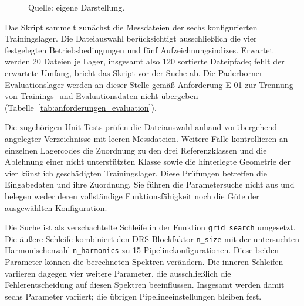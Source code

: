 \begin{figure}[htbp]
{%
  }
  \caption{Trennung von Pipelineverarbeitung und wiederholter
    Detektorauswertung in der Parametersuche}
  \label{fig:parametersuche_ablauf}
  \caption*{\footnotesize Quelle: eigene Darstellung.}
\end{figure}

Das Skript  sammelt zunächst die Messdateien
der sechs konfigurierten Trainingslager. Die Dateiauswahl berücksichtigt
ausschließlich die vier festgelegten Betriebsbedingungen und fünf
Aufzeichnungsindizes. Erwartet werden 20 Dateien je Lager, insgesamt also
120 sortierte Dateipfade; fehlt der erwartete Umfang, bricht das Skript vor
der Suche ab. Die Paderborner Evaluationslager werden an dieser Stelle gemäß
Anforderung \hyperlink{req:E-01}{E-01} zur Trennung von Trainings- und Evaluationsdaten nicht
übergeben (Tabelle~\ref{tab:anforderungen_evaluation}).

Die zugehörigen Unit-Tests prüfen die Dateiauswahl anhand vorübergehend
angelegter Verzeichnisse mit leeren Messdateien. Weitere Fälle kontrollieren
an einzelnen Lagercodes die Zuordnung zu den drei Referenzklassen und die
Ablehnung einer nicht unterstützten Klasse sowie die hinterlegte Geometrie
der vier künstlich geschädigten Trainingslager. Diese Prüfungen betreffen
die Eingabedaten und ihre Zuordnung. Sie führen die Parametersuche nicht aus
und belegen weder deren vollständige Funktionsfähigkeit noch die Güte der
ausgewählten Konfiguration.

Die Suche ist als verschachtelte Schleife in der Funktion
\texttt{grid\_\allowbreak search} umgesetzt. Die äußere Schleife kombiniert
den DRS-Blockfaktor \texttt{n\_size} mit der untersuchten Harmonischenzahl
\texttt{n\_harmonics} zu 15 Pipelinekonfigurationen. Diese beiden Parameter
können die berechneten Spektren verändern. Die inneren Schleifen variieren
dagegen vier weitere Parameter, die ausschließlich die Fehlerentscheidung
auf diesen Spektren beeinflussen. Insgesamt werden damit sechs Parameter
variiert; die übrigen Pipelineeinstellungen bleiben fest.


